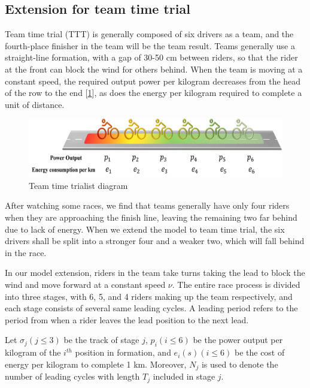 \subsection{Extension for team time trial}
\par Team time trial (TTT) is generally composed of six drivers as a team, and the fourth-place finisher in the team will be the team result. Teams generally use a straight-line formation, with a gap of 30-50 cm between riders, so that the rider at the front can block the wind for others behind. When the team is moving at a constant speed, the required output power per kilogram decreases from the head of the row to the end [\ref{beauty}], as does the energy per kilogram required to complete a unit of distance.
\begin{figure}[h]
	\centering
	\includegraphics[width=1\linewidth]{image/beauty}
	\caption{Team time trialist diagram}
	\label{beauty}
\end{figure}

\par After watching some races, we find that teams generally have only four riders when they are approaching the finish line, leaving the remaining two far behind due to lack of energy. When we extend the model to team time trial, the six drivers shall be split into a stronger four and a weaker two, which will fall behind in the race.

\par In our model extension, riders in the team take turns taking the lead to block the wind and move forward at a constant speed $\nu$. The entire race process is divided into three stages, with 6, 5, and 4 riders making up the team respectively, and each stage consists of several same leading cycles. A leading period refers to the period from when a rider leaves the lead position to the next lead.

\par Let $\sigma_j(j\leq3)$ be the track of stage $j$, $p_i(i\leq6)$ be the power output per kilogram of the $i^{th}$ position in formation, and $e_i(s)(i\leq6)$ be the cost of energy per kilogram to complete 1 km. Moreover, $N_j$ is used to denote the number of leading cycles with length $T_j$ included in stage $j$.

